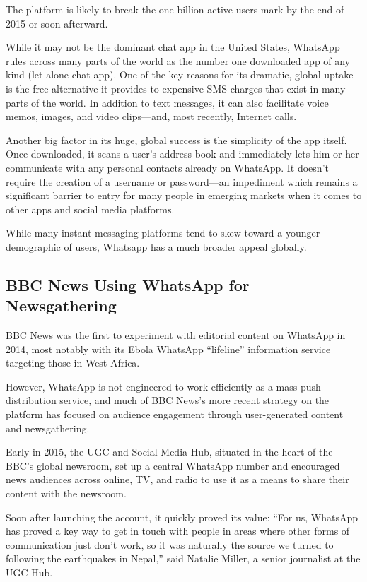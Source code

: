 \documentclass[notoc, symmetric, nobib, nols]{towcenter-guideto-book}
\begin{document}
The platform is likely to break the one billion active users mark by the end of 2015 or soon afterward. 

While it may not be the dominant chat app in the United States, WhatsApp rules across many parts of the world as the number one downloaded app of any kind (let alone chat app). One of the key reasons for its dramatic, global uptake is the free alternative it provides to expensive SMS charges that exist in many parts of the world. In addition to text messages, it can also facilitate voice memos, images, and video clips---and, most recently, Internet calls.

Another big factor in its huge, global success is the simplicity of the app itself. Once downloaded, it scans a user's address book and immediately lets him or her communicate with any personal contacts already on WhatsApp. It doesn't require the creation of a username or password---an impediment which remains a significant barrier to entry for many people in emerging markets when it comes to other apps and social media platforms.

While many instant messaging platforms tend to skew toward a younger demographic of users, Whatsapp has a much broader appeal globally.

\subsection{BBC News Using WhatsApp for Newsgathering}

BBC News was the first to experiment with editorial content on WhatsApp in 2014, most notably with its Ebola WhatsApp ``lifeline'' information service targeting those in West Africa.\autocite{BarotEbola} 

However, WhatsApp is not engineered to work efficiently as a mass-push distribution service, and much of BBC News's more recent strategy on the platform has focused on audience engagement through user-generated content and newsgathering. 

Early in 2015, the UGC and Social Media Hub, situated in the heart of the BBC's global newsroom, set up a central WhatsApp number and encouraged news audiences across online, TV, and radio to use it as a means to share their content with the newsroom.\autocite{BBCWhatsApp} 

Soon after launching the account, it quickly proved its value: ``For us, WhatsApp has proved a key way to get in touch with people in areas where other forms of communication just don't work, so it was naturally the source we turned to following the earthquakes in Nepal,'' said Natalie Miller, a senior journalist at the UGC Hub.
\end{document}
